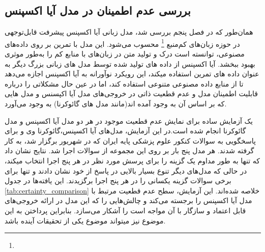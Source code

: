 \subsection{
بررسی عدم اطمینان در مدل آیا اکسپنس
}
همان‌طور که در فصل پنجم بررسی شد، مدل زبانی آیا اکسپنس پیشرفت قابل‌توجهی در حوزه زبان‌های کم‌منبع
\footnote{}
محسوب می‌شود. این مدل با تمرین بر روی داده‌های مصنوعی، توانسته است درک و تولید متن در زبان‌های با منابع کم را به‌طور موثری بهبود ببخشد. آیا اکسپنس از داده های تولید شده توسط مدل های زبانی بزرگ دیگر به عنوان داده های تمرین استفاده میکند،  این رویکرد نوآورانه به آیا اکسپنس اجازه می‌دهد تا از منابع داده مصنوعی متنوعی استفاده کند، اما در عین حال مشکلاتی را درباره قابلیت اطمینان مدل و عدم قطعیت ذاتی در خروجی‌های مدل آیا اکپسنس و مدل هایی که بر اساس آن به وجود آمده اند(مانند مدل های گائوکرنا) به وجود می‌آورد.

یک آزمایش ساده برای نمایش عدم قطعیت موجود در هر دو مدل آیا اکسپنس و مدل گائوکرنا انجام شده است.در این آزمایش، مدل‌های آیا اکسپنس،گائوکرنا وی و
برای پاسخگویی به سوالات کنکور علوم پزشکی پایه ایران که در شهریور
برگزار شد، به کار گرفته شدند. هر مدل پنج بار بر روی این مجموعه از سوالات اجرا شد. نتایج نشان داد که تنها
به طور مداوم یک گزینه را برای پرسش مورد نظر در هر پنج اجرا انتخاب میکند، در حالی که مدل‌های دیگر تنوع بسیار بالایی در پاسخ از خود نشان دادند و تنها برای برخی سوالات گزینه یکسانی را در هر پنج اجرا برگزیدند. این یافته‌ها در جدول
\ref{tab:certainty_comparison}
خلاصه شده‌اند. این آزمایش، سطح عدم قطعیت مرتبط با مدل‌ آیا اکسپنس را برجسته می‌کند و چالش‌هایی را که این مدل‌ در ارائه خروجی‌های قابل اعتماد و سازگار با آن مواجه است را آشکار می‌سازد. بنابراین پرداختن به این موضوع نیز میتواند موضوع یکی از تحقیقات آینده باشد.


